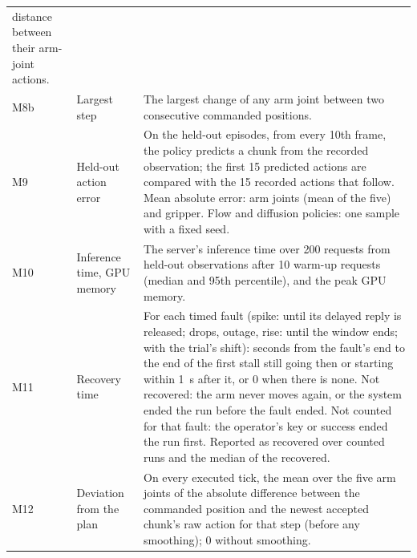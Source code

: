 \begin{longtable}{@{}l >{\raggedright\arraybackslash}p{} p{}@{}}
  distance between their arm-joint actions. \\
M8b & Largest step & The largest change of any arm joint between two consecutive commanded positions. \\
M9 & Held-out action error & On the held-out episodes, from every 10th frame, the policy predicts a chunk from the
  recorded observation; the first 15 predicted actions are compared with the 15 recorded actions that follow. Mean
  absolute error: arm joints (mean of the five) and gripper. Flow and diffusion policies: one sample with a fixed
  seed. \\
M10 & Inference time, GPU memory & The server's inference time over 200 requests from held-out observations after 10
  warm-up requests (median and 95th percentile), and the peak GPU memory. \\
M11 & Recovery time & For each timed fault (spike: until its delayed reply is released; drops, outage, rise: until the
  window ends; with the trial's shift): seconds from the fault's end to the end of the first stall still going then or
  starting within 1~s after it, or 0 when there is none. Not recovered: the arm never moves again, or the system ended
  the run before the fault ended. Not counted for that fault: the operator's key or success ended the run first.
  Reported as recovered over counted runs and the median of the recovered. \\
M12 & Deviation from the plan & On every executed tick, the mean over the five arm joints of the absolute difference
  between the commanded position and the newest accepted chunk's raw action for that step (before any smoothing);
  0 without smoothing. \\
\end{longtable}

